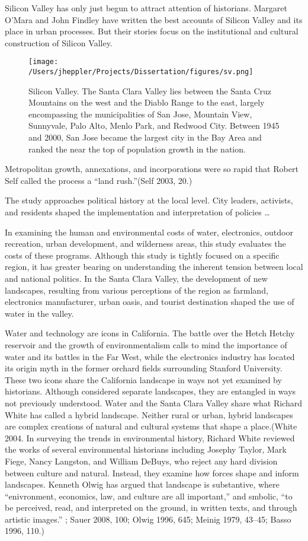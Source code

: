 \documentclass[11pt,article,oneside]{memoir}
\makeatletter
\def\maxwidth{\ifdim\Gin@nat@width>\linewidth\linewidth
\else\Gin@nat@width\fi}
\let\Oldincludegraphics\includegraphics
\renewcommand{\includegraphics}[1]{\Oldincludegraphics[width=\maxwidth]{#1}}
\makeatother
\begin{document}
Silicon Valley has only just begun to attract attention of historians.
Margaret O'Mara and John Findley have written the best accounts of
Silicon Valley and its place in urban processes. But their stories focus
on the institutional and cultural construction of Silicon Valley.

\begin{figure}[htbp]
\centering
\texttt{[image: /Users/jheppler/Projects/Dissertation/figures/sv.png]}
\caption{Silicon Valley. The Santa Clara Valley lies between the Santa
Cruz Mountains on the west and the Diablo Range to the east, largely
encompassing the municipalities of San Jose, Mountain View, Sunnyvale,
Palo Alto, Menlo Park, and Redwood City. Between 1945 and 2000, San Jose
became the largest city in the Bay Area and ranked the near the top of
population growth in the nation.}
\end{figure}

Metropolitan growth, annexations, and incorporations were so rapid that
Robert Self called the process a ``land rush.''(Self 2003, 20.)

The study approaches political history at the local level. City leaders,
activists, and residents shaped the implementation and interpretation of
policies \ldots{}

In examining the human and environmental costs of water, electronics,
outdoor recreation, urban development, and wilderness areas, this study
evaluates the costs of these programs. Although this study is tightly
focused on a specific region, it has greater bearing on understanding
the inherent tension between local and national politics. In the Santa
Clara Valley, the development of new landscapes, resulting from various
perceptions of the region as farmland, electronics manufacturer, urban
oasis, and tourist destination shaped the use of water in the valley.

Water and technology are icons in California. The battle over the Hetch
Hetchy reservoir and the growth of environmentalism calls to mind the
importance of water and its battles in the Far West, while the
electronics industry has located its origin myth in the former orchard
fields surrounding Stanford University. These two icons share the
California landscape in ways not yet examined by historians. Although
considered separate landscapes, they are entangled in ways not
previously understood. Water and the Santa Clara Valley share what
Richard White has called a hybrid landscape. Neither rural or urban,
hybrid landscapes are complex creations of natural and cultural systems
that shape a place.(White 2004. In surveying the trends in environmental
history, Richard White reviewed the works of several environmental
historians including Josephy Taylor, Mark Fiege, Nancy Langston, and
William DeBuys, who reject any hard division between culture and
natural. Instead, they examine how forces shape and inform landscapes.
Kenneth Olwig has argued that landscape is substantive, where
``enivronment, economics, law, and culture are all important,'' and
smbolic, ``to be perceived, read, and interpreted on the ground, in
written texts, and through artistic images.'' ; Sauer 2008, 100; Olwig
1996, 645; Meinig 1979, 43--45; Basso 1996, 110.)
\end{document}
